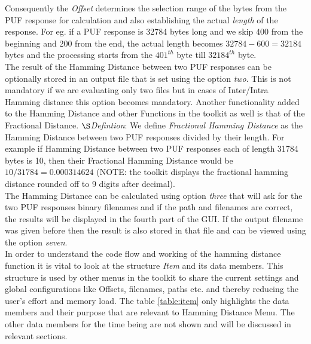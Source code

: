 Consequently the \emph{Offset} determines the selection range of the bytes from the PUF response for calculation and also establishing the actual \emph{length} of the response. For eg. if a PUF response is 32784 bytes long and we skip 400 from the beginning and 200 from the end, the actual length becomes $32784-600 = 32184$ bytes and the processing starts from the $401^{th}$ byte till $32184^{th}$ byte.\\

The result of the Hamming Distance between two PUF responses can be optionally stored in an output file that is set using the option \emph{two}. This is not mandatory if we are evaluating only two files but in cases of Inter/Intra Hamming distance this option becomes mandatory. Another functionality added to the Hamming Distance and other Functions in the toolkit as well is that of the Fractional Distance. \newline
$\S$\emph{Defintion}: We define \emph{Fractional Hamming Distance} as the Hamming Distance between two PUF
responses divided by their length. For example if Hamming Distance between two PUF responses each of length 31784 bytes is 10, then their Fractional Hamming Distance would be $ 10 / 31784 = 0.000314624$ (NOTE: the toolkit displays the fractional hamming distance rounded off to 9 digits after decimal).\\

The Hamming Distance can be calculated using option \emph{three} that will ask for the two PUF responses binary filenames and if the path and filenames are correct, the results will be displayed in the fourth part of the GUI. If the output filename was given before then the result is also stored in that file and can be viewed using the option \emph{seven}.\\

In order to understand the code flow and working of the hamming distance function it is vital to look at the structure \emph{Item} and its data members. This structure is used by other menus in the toolkit to share the current settings and global configurations like Offsets, filenames, paths etc. and thereby reducing the user's effort and memory load. The table \ref{table:item} only highlights the data members and their purpose that are relevant to Hamming Distance Menu. The other data members
for the time being are not shown and will be discussed in relevant sections.\\

